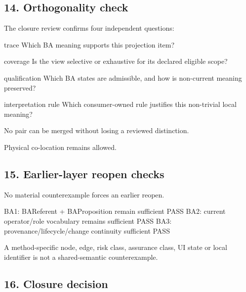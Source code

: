 \documentclass[
  11pt,
  a4paper,
]{article}
\newenvironment{Shaded}{}{}
\newcommand{\NormalTok}[1]{#1}
\begin{document}
\subsection{14. Orthogonality check}\label{orthogonality-check}

The closure review confirms four independent questions:

\begin{Shaded}
\begin{Highlighting}[]
\NormalTok{trace}
\NormalTok{  Which BA meaning supports this projection item?}

\NormalTok{coverage}
\NormalTok{  Is the view selective or exhaustive for its declared eligible scope?}

\NormalTok{qualification}
\NormalTok{  Which BA states are admissible, and how is non{-}current meaning preserved?}

\NormalTok{interpretation rule}
\NormalTok{  Which consumer{-}owned rule justifies this non{-}trivial local meaning?}
\end{Highlighting}
\end{Shaded}

No pair can be merged without losing a reviewed distinction.

Physical co-location remains allowed.

\subsection{15. Earlier-layer reopen
checks}\label{earlier-layer-reopen-checks}

No material counterexample forces an earlier reopen.

\begin{Shaded}
\begin{Highlighting}[]
\NormalTok{BA1: BAReferent + BAProposition remain sufficient       PASS}
\NormalTok{BA2: current operator/role vocabulary remains sufficient PASS}
\NormalTok{BA3: provenance/lifecycle/change continuity sufficient  PASS}
\end{Highlighting}
\end{Shaded}

A method-specific node, edge, risk class, assurance class, UI state or
local identifier is not a shared-semantic counterexample.

\subsection{16. Closure decision}\label{closure-decision}
\end{document}
